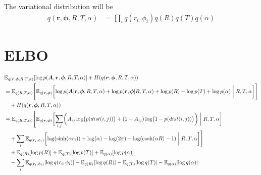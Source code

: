 \documentclass{article}
\renewcommand{\v}[1]{\bm{#1}}
\newcommand{\E}{\mathbb{E}}
\begin{document}
The variational distribution will be
\begin{equation}
\begin{split}
q(\v{r}, \v{\phi}, R,T,\alpha)
&= \prod_i q(r_i,\phi_i) q(R) q(T) q(\alpha)
\end{split}
\end{equation}

\section{ELBO}
\begin{equation}
\begin{aligned}
& \E_{q(\v{r}, \v{\phi}, R,T,\alpha)}[\log p(\v{A}, \v{r}, \v{\phi}, R,T,\alpha)] + H(q(\v{r}, \v{\phi}, R,T,\alpha)) \\ 
&= \E_{q( R,T,\alpha)} \Biggl[ 
\E_{q(\v{r}, \v{\phi})} \biggl[ \log p(\v{A} | \v{r}, \v{\phi}, R,T,\alpha) 
+ \log p(\v{r}, \v{\phi} | R,T,\alpha) +\log p(R) + \log p(T) + \log p(\alpha) \biggm\vert R,T,\alpha \biggr] \Biggr]\\ 
& \quad + H(q(\v{r}, \v{\phi}, R,T,\alpha)) \\
&= \E_{q( R,T,\alpha)} \Biggl[ 
\E_{q(\v{r}, \v{\phi})} \biggl[ 
\sum_{i,j} \biggl( A_{ij} \log \bigl(p(dist(i,j))\bigr) + (1-A_{ij}) \log \bigl(1 - p(dist(i,j))\bigr) \biggr) \biggm\vert R,T,\alpha \biggr]\\
& \quad+ \sum_i \E_{q(r_i,\phi_i)} \biggl[ \log(\sinh(\alpha r_i)) + \log(\alpha) - \log(2\pi) -\log(\cosh(\alpha R) -1) \biggm\vert R,T,\alpha \biggr] \Biggr]\\ 
& \quad +\E_{q(R)}[\log p(R)] + \E_{q(T)}[\log p(T)] + \E_{q(\alpha)}[\log p(\alpha)]\\
& \quad - \sum_i \E_{q(r_i,\phi_i)} [\log q(r_i,\phi_i)] - \E_{q(R)}[\log q(R)] - \E_{q(T)}[\log q(T)] - \E_{q(\alpha)}[\log q(\alpha)]  \\
\end{aligned}
\end{equation}
\end{document}

